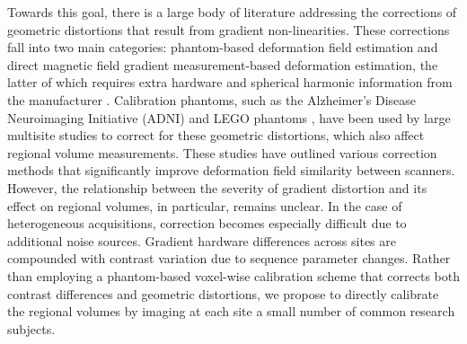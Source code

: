 Towards this goal, there is a large body of literature addressing the corrections of geometric distortions that result from gradient non-linearities. These corrections fall into two main categories: phantom-based deformation field estimation and direct magnetic field gradient measurement-based deformation estimation, the latter of which requires extra hardware and spherical harmonic information from the manufacturer \cite{fonov2010improved}. Calibration phantoms, such as the Alzheimer's Disease Neuroimaging Initiative (ADNI) \cite{gunter2009measurement} and LEGO phantoms \cite{caramanos2010gradient}, have been used by large multisite studies to correct for these geometric distortions, which also affect regional volume measurements. These studies have outlined various correction methods that significantly improve deformation field similarity between scanners. However, the relationship between the severity of gradient distortion and its effect on regional volumes, in particular, remains unclear. In the case of heterogeneous acquisitions, correction becomes especially difficult due to additional noise sources. Gradient hardware differences across sites are compounded with contrast variation due to sequence parameter changes. %
Rather than employing a phantom-based voxel-wise calibration scheme that corrects both contrast differences and geometric distortions, we propose to directly calibrate the regional volumes by imaging at each site a small number of common research subjects.